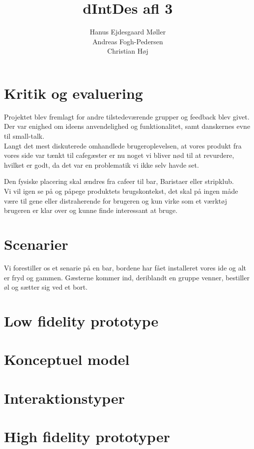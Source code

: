 \documentclass{article}
\title{dIntDes afl 3}
\author{
	Hanus Ejdesgaard Møller \\
	Andreas Fogh-Pedersen \\
	Christian Høj
}
\begin{document}
\maketitle
\section{Kritik og evaluering}
Projektet blev fremlagt for andre tilstedeværende grupper og feedback blev givet. Der var enighed om ideens anvendelighed og funktionalitet, samt danskernes evne til small-talk.\\
Langt det mest diskuterede omhandlede brugeroplevelsen, at vores produkt fra vores side var tænkt til cafegæster er nu noget vi bliver nød til at revurdere, hvilket er godt, da det var en problematik vi ikke selv havde set.

Den fysiske placering skal ændres fra cafeer til bar, Baristaer eller stripklub.\\
Vi vil igen se på og påpege produktets brugskontekst, det skal på ingen måde være til gene eller distraherende for brugeren og kun virke som et værktøj brugeren er klar over og kunne finde interessant at bruge.
\section{Scenarier}
Vi forestiller os et senarie på en bar, bordene har fået installeret vores ide og alt er fryd og gammen. Gæsterne kommer ind, deriblandt en gruppe venner, bestiller øl og sætter sig ved et bort. 
\section{Low fidelity prototype}

\section{Konceptuel model}

\section{Interaktionstyper}

\section{High fidelity prototyper}
\end{document}
